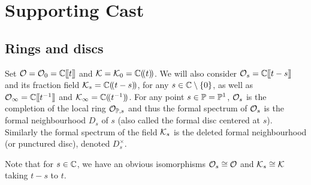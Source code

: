 \documentclass[draft]{article} %
\begin{document}



\section{Supporting Cast}
\label{s:players}
\subsection{Rings and discs}
\label{ss:rings}
Set $\cO = \cO_0 = \CC\xt$ and $\cK = \cK_0 = \CC\xT$.
We will also consider $\cO_s = \CC\xt[t-s]$ and its fraction field $\cK_s=\CC\xT[t-s]$, for any 
$ s \in \CC\setminus\{0\} $, as well as $ \Oinf = \CC\xt[t^{-1}] $ and $\Kinf = \CC\xT[t^{-1}]$. For any point $ s \in \PP = \PP^1$, 
$ \cO_s$ is the completion of the local ring $ \mathcal O_{\PP, s} $ and thus the formal spectrum of $ \cO_s$ is the formal neighbourhood $ D_s$ of $ s $ (also called the formal disc centered at $ s$).  Similarly the formal spectrum of the field $\cK_s$ is the deleted formal neighbourhood (or punctured disc), denoted $ D_s^\times$.

Note that for $ s \in \CC $, we have an obvious isomorphisms  $\cO_s \cong \cO$ and $\cK_s\cong\cK$ taking $ t-s $ to $ t$. %
% 
\end{document}
